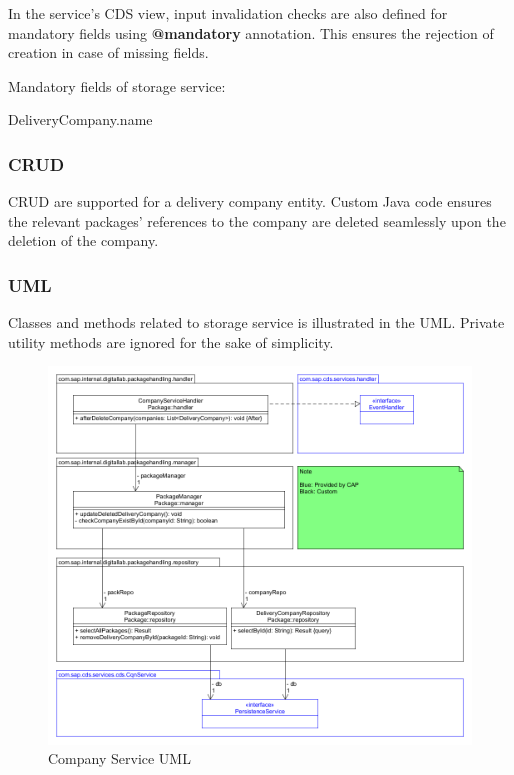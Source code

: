 \bigskip
In the service's CDS view, input invalidation checks are also defined for mandatory fields using \textbf{@mandatory} annotation. This ensures the rejection of creation in case of missing fields. 

\bigskip
Mandatory fields of storage service:
\begin{compactenum}
	\item DeliveryCompany.name
\end{compactenum}

\subsubsection{CRUD}
CRUD are supported for a delivery company entity. Custom Java code ensures the relevant packages' references to the company are deleted seamlessly upon the deletion of the company.

\subsubsection{UML}

Classes and methods related to storage service is illustrated in the UML. Private utility methods are ignored for the sake of simplicity.
\begin{figure}[!h]
    \centering
    \includegraphics[width=1\linewidth]{images/service_class_diagrams/company_service_class_diagram.png}
    \caption{Company Service UML}
    \label{fig:company_service_uml}
\end{figure}
\pagebreak

